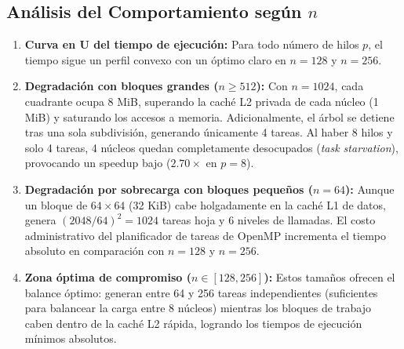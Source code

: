 \subsection{Análisis del Comportamiento según $n$}
\begin{enumerate}
    \item \textbf{Curva en U del tiempo de ejecución:} Para todo número de hilos $p$, el tiempo sigue un perfil convexo con un óptimo claro en $n=128$ y $n=256$.
    \item \textbf{Degradación con bloques grandes ($n \ge 512$):} Con $n=1024$, cada cuadrante ocupa 8 MiB, superando la caché L2 privada de cada núcleo (1 MiB) y saturando los accesos a memoria. Adicionalmente, el árbol se detiene tras una sola subdivisión, generando únicamente 4 tareas. Al haber 8 hilos y solo 4 tareas, 4 núcleos quedan completamente desocupados (\emph{task starvation}), provocando un speedup bajo ($2.70\times$ en $p=8$).
    \item \textbf{Degradación por sobrecarga con bloques pequeños ($n=64$):} Aunque un bloque de $64 \times 64$ (32 KiB) cabe holgadamente en la caché L1 de datos, genera $(2048/64)^2 = 1024$ tareas hoja y 6 niveles de llamadas. El costo administrativo del planificador de tareas de OpenMP incrementa el tiempo absoluto en comparación con $n=128$ y $n=256$.
    \item \textbf{Zona óptima de compromiso ($n \in [128, 256]$):} Estos tamaños ofrecen el balance óptimo: generan entre 64 y 256 tareas independientes (suficientes para balancear la carga entre 8 núcleos) mientras los bloques de trabajo caben dentro de la caché L2 rápida, logrando los tiempos de ejecución mínimos absolutos.
\end{enumerate}
